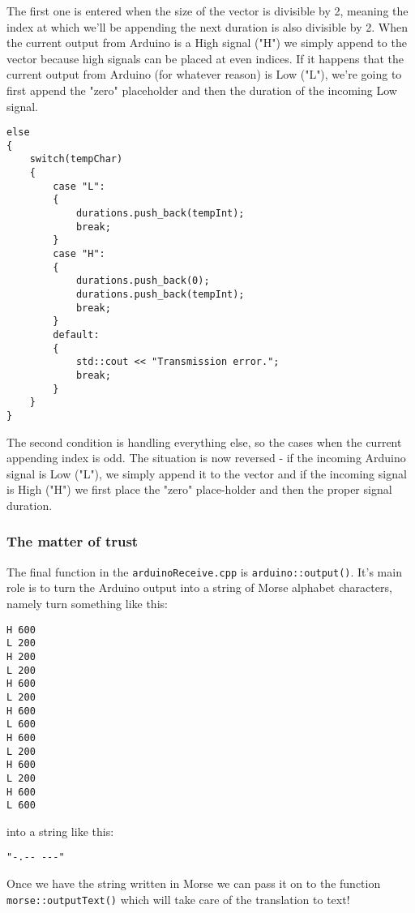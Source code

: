 \documentclass[12pt]{report}
\begin{document}
The first one is entered when the size of the vector is divisible by 2, meaning the index at which we'll be appending the next duration is also divisible by 2. When the current output from Arduino is a High signal ("H") we simply append to the vector because high signals can be placed at even indices. If it happens that the current output from Arduino (for whatever reason) is Low ("L"), we're going to first append the "zero" placeholder and then the duration of the incoming Low signal.

\newpage

\begin{lstlisting}
else
{
	switch(tempChar)
	{
		case "L":
		{
			durations.push_back(tempInt);
			break;
		}
		case "H":
		{
			durations.push_back(0);
			durations.push_back(tempInt);
			break;
		}
		default:
		{
			std::cout << "Transmission error.";
			break;
		}
	}
}
\end{lstlisting}

The second condition is handling everything else, so the cases when the current appending index is odd. The situation is now reversed - if the incoming Arduino signal is Low ("L"), we simply append it to the vector and if the incoming signal is High ("H") we first place the "zero" place-holder and then the proper signal duration.

\subsubsection{The matter of trust}

The final function in the \texttt{arduinoReceive.cpp} is \texttt{arduino::output()}. It's main role is to turn the Arduino output into a string of Morse alphabet characters, namely turn something like this:

\begin{snugshade}
\begin{verbatim}
H 600
L 200
H 200
L 200
H 600
L 200
H 600
L 600
H 600
L 200
H 600
L 200
H 600
L 600
\end{verbatim}
\end{snugshade}

into a string like this:

\begin{snugshade}
\begin{verbatim}
"-.-- ---"
\end{verbatim}
\end{snugshade}

Once we have the string written in Morse we can pass it on to the function \texttt{morse::outputText()} which will take care of the translation to text!
\end{document}
